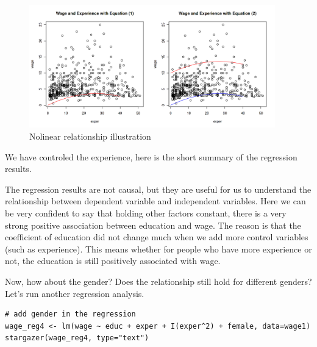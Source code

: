 \documentclass[11pt]{article}
\theoremstyle{definition}
\begin{document}
\begin{figure}[!htbp]
  \centering
  \includegraphics[width=0.95\textwidth]{./figures/reg_figure3.png}
  \caption{Nolinear relationship illustration}
\end{figure}


We have controled the experience, here is the short summary of the regression results. 

The regression results are not causal, but they are useful for us to understand 
the relationship between dependent variable and independent variables.
 Here we can be very confident to say that holding other factors constant, 
 there is a very strong positive association between education and wage. 
 The reason is that the coefficient of education did not change much
when we add more control variables (such as experience). This means whether 
for people who have more experience or not, the education is still positively 
associated with wage.

Now, how about the gender? Does the relationship still hold for different genders? 
Let's run another regression analysis.

\begin{lstlisting}
# add gender in the regression
wage_reg4 <- lm(wage ~ educ + exper + I(exper^2) + female, data=wage1)
stargazer(wage_reg4, type="text")
\end{lstlisting}
\end{document}
